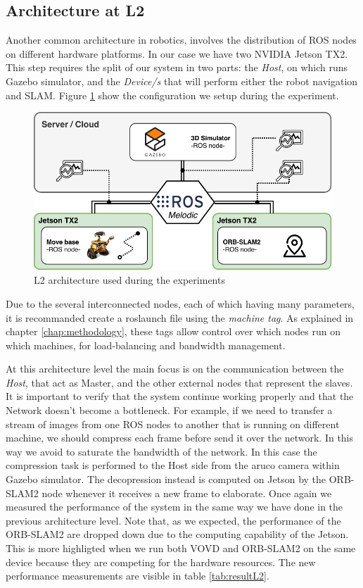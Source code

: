 \subsection{Architecture at L2} %
Another common architecture in robotics, involves the distribution of ROS nodes on different hardware platforms. In our case we have two NVIDIA Jetson TX2. 
This step requires the split of our system in two parts: the \textit{Host}, on which runs Gazebo simulator, and the \textit{Device/s} that will perform either the robot navigation and SLAM.
Figure \ref{fig:l2arch-exp} show the configuration we setup during the experiment.

\begin{figure}[htbp]
	\centering
	\includegraphics[width=\textwidth]{images/L2-arch-exp}
	\caption{L2 architecture used during the experiments}
	\label{fig:l2arch-exp}
\end{figure}

Due to the several interconnected nodes, each of which having many parameters, it is recommanded create a roslaunch file  using the \textit{machine tag}. As explained in chapter \ref{chap:methodology}, these tags allow control over which nodes run on which machines, for load-balancing and bandwidth management.

At this architecture level the main focus is on the communication between the \textit{Host}, that act as Master, and the other external nodes that represent the slaves. It is important to verify that the system continue working properly and that the Network doesn't become a bottleneck. For example, if we need to transfer a stream of images from one ROS nodes to another that is running on different machine, we should compress each frame before send it over the network. In this way we avoid to saturate the bandwidth of the network. In this case the compression task is performed to the Host side from the aruco camera within Gazebo simulator. The decopression instead is computed on Jetson by the ORB-SLAM2 node whenever it receives a new frame to elaborate.
Once again we measured the performance of the system in the same way we have done in the previous architecture level.
Note that, as we expected, the performance of the ORB-SLAM2 are dropped down due to the computing capability of the Jetson. This is more highligted when we run both VOVD and ORB-SLAM2 on the same device because they are competing for the hardware resources.
The new performance measurements are visible in table \ref{tab:resultL2}.

